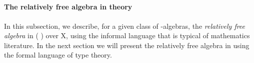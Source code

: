\begin{code}%
\>[0]\<%
\\
%
\>[1]\AgdaSpace{}%
\AgdaSymbol{:}\AgdaSpace{}%
\AgdaSymbol{(}\AgdaSpace{}%
\AgdaSymbol{:}\AgdaSpace{}%
\AgdaSpace{}%
\AgdaSpace{}%
\AgdaOperator{\AgdaFunction{𝕌[}}\AgdaSpace{}%
\AgdaSpace{}%
\AgdaOperator{\AgdaFunction{]}}\AgdaSymbol{)(}\AgdaSpace{}%
\AgdaSymbol{:}\AgdaSpace{}%
\AgdaSpace{}%
\AgdaSymbol{)}\AgdaSpace{}%
\AgdaSpace{}%
\AgdaSpace{}%
\AgdaSpace{}%
\AgdaSpace{}%
\AgdaSpace{}%
\AgdaSpace{}%
\AgdaSpace{}%
\AgdaSymbol{(}\AgdaSymbol{\{}\AgdaSpace{}%
\AgdaSymbol{=}\AgdaSpace{}%
\AgdaSymbol{\}}\AgdaSpace{}%
\AgdaSymbol{)}\AgdaSpace{}%
\<%
\\
%
\>[1]\AgdaSpace{}%
\AgdaSpace{}%
\AgdaSymbol{(}\AgdaSpace{}%
\AgdaSymbol{)}%
\>[32]\AgdaSymbol{=}\AgdaSpace{}%
\<%
\\
%
\>[1]\AgdaSpace{}%
\AgdaSpace{}%
\AgdaSymbol{(}\AgdaSpace{}%
\AgdaSpace{}%
\AgdaSymbol{)}%
\>[32]\AgdaSymbol{=}\AgdaSpace{}%
\AgdaSpace{}%
\AgdaSymbol{(}\AgdaSpace{}%
\AgdaSymbol{)}\AgdaSpace{}%
\AgdaSymbol{(}\AgdaSpace{}%
\AgdaOperator{\AgdaInductiveConstructor{,}}\AgdaSpace{}%
\AgdaSymbol{(}\AgdaSpace{}%
\AgdaSymbol{)}\AgdaSpace{}%
\AgdaSpace{}%
\AgdaSymbol{)}\<%
\end{code}

\paragraph*{The relatively free algebra in theory}
In this subsection, we describe, for a given class  of -algebras, the
\emph{relatively free algebra} in  ( ) over \ab X, using the informal
language that is typical of mathematics literature. In the next section we will present
the relatively free algebra in \agda using the formal language of type theory.

